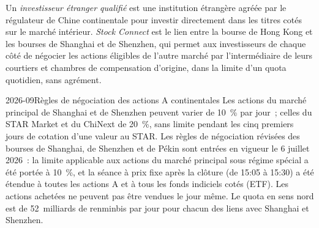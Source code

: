 \begin{definition}\label{def:m1:asian-and-emerging-equity-markets:connect}
Un \emph{investisseur étranger qualifié} est une
institution étrangère agréée par le régulateur de Chine continentale pour investir directement dans les
titres cotés sur le marché intérieur. \emph{Stock Connect} est le lien entre la
bourse de Hong Kong et les bourses de Shanghai et de Shenzhen, qui permet aux investisseurs
de chaque côté de négocier les actions éligibles de l'autre marché par l'intermédiaire de leurs
courtiers et chambres de compensation d'origine, dans la limite d'un quota quotidien, sans agrément.
\end{definition}

\begin{dated}{2026-09}{Règles de négociation des actions A continentales}\label{dat:m1:asian-and-emerging-equity-markets:china}
Les actions du marché principal de Shanghai et de Shenzhen peuvent varier de 10~\% par jour~; celles
du STAR Market et du ChiNext de 20~\%, sans limite pendant les cinq premiers jours de cotation
d'une valeur au STAR. Les règles de négociation révisées des bourses de Shanghai, de Shenzhen et de
Pékin sont entrées en vigueur le 6 juillet 2026~: la limite applicable aux actions du marché principal
sous régime spécial a été portée à 10~\%, et la séance à prix fixe après la clôture (de 15:05 à
15:30) a été étendue à toutes les actions A et à tous les fonds indiciels cotés (ETF).
Les actions achetées ne peuvent pas être vendues le jour même. Le quota  en sens nord
est de 52~milliards de renminbis par jour pour chacun des liens avec Shanghai et Shenzhen.
\end{dated}

